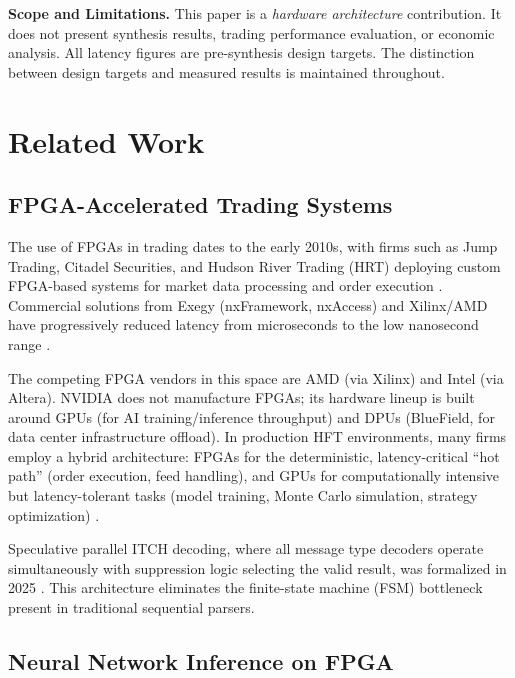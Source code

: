 \documentclass[conference,10pt]{IEEEtran}
\begin{document}
\noindent\textbf{Scope and Limitations.} This paper is a \textit{hardware architecture} contribution. It does not present synthesis results, trading performance evaluation, or economic analysis. All latency figures are pre-synthesis design targets. The distinction between design targets and measured results is maintained throughout.

\section{Related Work}
\label{sec:related}

\subsection{FPGA-Accelerated Trading Systems}

The use of FPGAs in trading dates to the early 2010s, with firms such as Jump Trading, Citadel Securities, and Hudson River Trading (HRT) deploying custom FPGA-based systems for market data processing and order execution \cite{aldridge2013}. Commercial solutions from Exegy (nxFramework, nxAccess) and Xilinx/AMD have progressively reduced latency from microseconds to the low nanosecond range \cite{exegy2024}.

The competing FPGA vendors in this space are AMD (via Xilinx) and Intel (via Altera). NVIDIA does not manufacture FPGAs; its hardware lineup is built around GPUs (for AI training/inference throughput) and DPUs (BlueField, for data center infrastructure offload). In production HFT environments, many firms employ a hybrid architecture: FPGAs for the deterministic, latency-critical ``hot path'' (order execution, feed handling), and GPUs for computationally intensive but latency-tolerant tasks (model training, Monte Carlo simulation, strategy optimization) \cite{amd2024}.

Speculative parallel ITCH decoding, where all message type decoders operate simultaneously with suppression logic selecting the valid result, was formalized in 2025 \cite{techrxiv2025}. This architecture eliminates the finite-state machine (FSM) bottleneck present in traditional sequential parsers.

\subsection{Neural Network Inference on FPGA}
\end{document}
